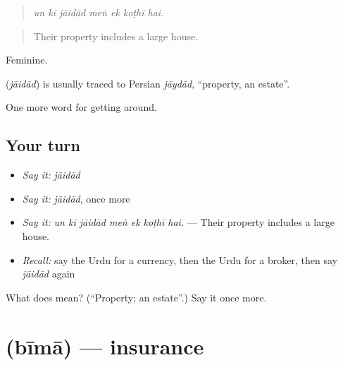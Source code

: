 \begin{quote}
      
\end{quote}

\begin{quote}
\emph{un kī jāidād meṅ ek koṭhī hai.}
\end{quote}

\begin{quote}
Their property includes a large house.
\end{quote}

Feminine.

\begin{cousinweb}
\textbf{} (\emph{jāidād}) is usually traced to Persian \emph{jāydād}, \textquotedblleft{}property, an estate\textquotedblright{}.
\end{cousinweb}

\begin{grammarlens}[title={What you've built}]
One more word for getting around.
\end{grammarlens}

\subsection*{Your turn}
\begin{itemize}
\raggedright
  \item \emph{Say it:} \emph{jāidād}
  \item \emph{Say it:} \emph{jāidād}, once more
  \item \emph{Say it:} \emph{un kī jāidād meṅ ek koṭhī hai.} — Their property includes a large house.
  \item \emph{Recall:} say the Urdu for a currency, then the Urdu for a broker, then say \emph{jāidād} again
\end{itemize}

\begin{tcolorbox}[breakable,colback=teal!4,colframe=teal!35!black,title={Before you move on}]
What does  mean? (\textquotedblleft{}Property; an estate\textquotedblright{}.) Say it once more.
\end{tcolorbox}
\section[\texorpdfstring{\ur{بیمہ} (bīmā)}{بیمہ (bīmā)}]{ (bīmā) — insurance}

\label{lesson:UR-C422-bima}



